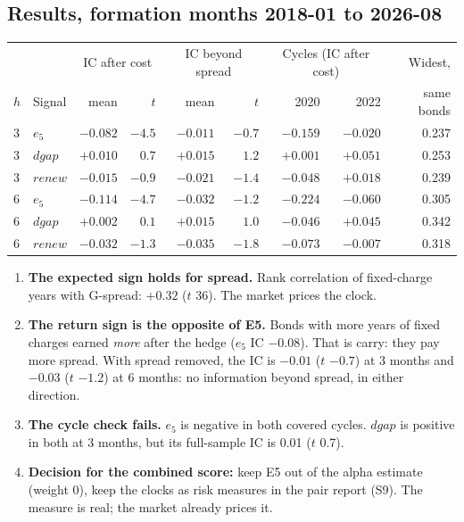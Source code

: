 \documentclass[11pt,a4paper]{article}
\begin{document}
\subsection*{Results, formation months 2018-01 to 2026-08}
{\small
\begin{tabular}{@{}llrrrrrrr@{}}\toprule
 & & \multicolumn{2}{c}{IC after cost} & \multicolumn{2}{c}{IC beyond spread} & \multicolumn{2}{c}{Cycles (IC after cost)} & Widest, \\
$h$ & Signal & mean & $t$ & mean & $t$ & 2020 & 2022 & same bonds \\\midrule
3 & $e_5$   & $-0.082$ & $-4.5$ & $-0.011$ & $-0.7$ & $-0.159$ & $-0.020$ & 0.237 \\
3 & $dgap$  & $+0.010$ & $0.7$  & $+0.015$ & $1.2$  & $+0.001$ & $+0.051$ & 0.253 \\
3 & $renew$ & $-0.015$ & $-0.9$ & $-0.021$ & $-1.4$ & $-0.048$ & $+0.018$ & 0.239 \\\midrule
6 & $e_5$   & $-0.114$ & $-4.7$ & $-0.032$ & $-1.2$ & $-0.224$ & $-0.060$ & 0.305 \\
6 & $dgap$  & $+0.002$ & $0.1$  & $+0.015$ & $1.0$  & $-0.046$ & $+0.045$ & 0.342 \\
6 & $renew$ & $-0.032$ & $-1.3$ & $-0.035$ & $-1.8$ & $-0.073$ & $-0.007$ & 0.318 \\\bottomrule
\end{tabular}}

\begin{enumerate}
\item \textbf{The expected sign holds for spread.} Rank correlation of fixed-charge years with G-spread: $+0.32$ ($t$ 36). The market prices the clock.
\item \textbf{The return sign is the opposite of E5.} Bonds with more years of fixed charges earned \emph{more} after the hedge ($e_5$ IC $-0.08$). That is carry: they pay more spread. With spread removed, the IC is $-0.01$ ($t$ $-0.7$) at 3 months and $-0.03$ ($t$ $-1.2$) at 6 months: no information beyond spread, in either direction.
\item \textbf{The cycle check fails.} $e_5$ is negative in both covered cycles. $dgap$ is positive in both at 3 months, but its full-sample IC is 0.01 ($t$ 0.7).
\item \textbf{Decision for the combined score:} keep E5 out of the alpha estimate (weight 0), keep the clocks as risk measures in the pair report (S9). The measure is real; the market already prices it.
\end{enumerate}
\end{document}
